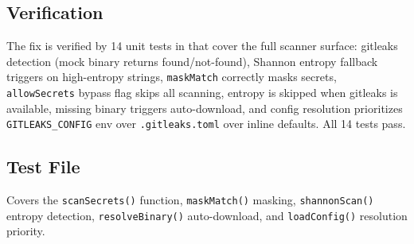 \subsection*{Verification}
The fix is verified by 14 unit tests in  that cover the full scanner surface: gitleaks detection (mock binary returns found/not-found), Shannon entropy fallback triggers on high-entropy strings, \texttt{maskMatch} correctly masks secrets, \texttt{allowSecrets} bypass flag skips all scanning, entropy is skipped when gitleaks is available, missing binary triggers auto-download, and config resolution prioritizes \texttt{GITLEAKS\_CONFIG} env over \texttt{.gitleaks.toml} over inline defaults. All 14 tests pass.

\subsection*{Test File}

Covers the \texttt{scanSecrets()} function, \texttt{maskMatch()} masking, \texttt{shannonScan()} entropy detection, \texttt{resolveBinary()} auto-download, and \texttt{loadConfig()} resolution priority.
